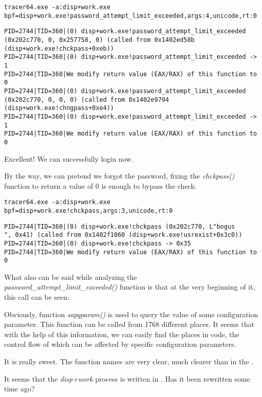 \begin{lstlisting}
tracer64.exe -a:disp+work.exe bpf=disp+work.exe!password_attempt_limit_exceeded,args:4,unicode,rt:0
\end{lstlisting}

\begin{lstlisting}
PID=2744|TID=360|(0) disp+work.exe!password_attempt_limit_exceeded (0x202c770, 0, 0x257758, 0) (called from 0x1402ed58b (disp+work.exe!chckpass+0xeb))
PID=2744|TID=360|(0) disp+work.exe!password_attempt_limit_exceeded -> 1
PID=2744|TID=360|We modify return value (EAX/RAX) of this function to 0
PID=2744|TID=360|(0) disp+work.exe!password_attempt_limit_exceeded (0x202c770, 0, 0, 0) (called from 0x1402e9794 (disp+work.exe!chngpass+0xe4))
PID=2744|TID=360|(0) disp+work.exe!password_attempt_limit_exceeded -> 1
PID=2744|TID=360|We modify return value (EAX/RAX) of this function to 0
\end{lstlisting}

Excellent! We can successfully login now.

By the way, we can pretend we forgot the password, fixing the \emph{chckpass()} function to return a value of 0 is enough to bypass the check:

\begin{lstlisting}
tracer64.exe -a:disp+work.exe bpf=disp+work.exe!chckpass,args:3,unicode,rt:0
\end{lstlisting}

\begin{lstlisting}
PID=2744|TID=360|(0) disp+work.exe!chckpass (0x202c770, L"bogus                                   ", 0x41) (called from 0x1402f1060 (disp+work.exe!usrexist+0x3c0))
PID=2744|TID=360|(0) disp+work.exe!chckpass -> 0x35
PID=2744|TID=360|We modify return value (EAX/RAX) of this function to 0
\end{lstlisting}

What also can be said while analyzing the \\
\emph{password\_attempt\_limit\_exceeded()} 
function is that at the very beginning of it, this call can be seen:



Obviously, function \emph{sapgparam()} is used to query the value of some configuration parameter. This function can be called from 1768 different places.
It seems that with the help of this information, we can easily find the places in code, the control flow of which can be affected by specific configuration parameters.

It is really sweet. The function names are very clear, much clearer than in the \oracle. 
\myindex{\Cpp}

It seems that the \emph{disp+work} process is written in \Cpp. Has it been rewritten some time ago?

